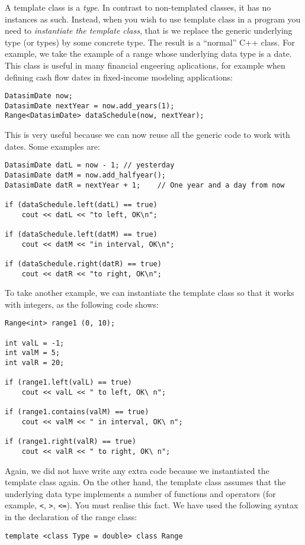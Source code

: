 A template class is a \emph{type}. In contrast to non-templated classes, it has no instances as such. Instead, when you wish to use template class in a program you need to \emph{instantiate the template class}, that is we replace the generic underlying type (or types) by some concrete type. The result is a ``normal'' C++ class. For example, we take the example of a range whose underlying data type is a date. This class is useful in many financial engeering aplications, for example when defining cash flow dates in fixed-income modeling applications:
\begin{lstlisting}
DatasimDate now;
DatasimDate nextYear = now.add_years(1);
Range<DatasimDate> dataSchedule(now, nextYear);
\end{lstlisting}
This is very useful because we can now reuse all the generic code to work with dates. Some examples are:
\begin{lstlisting}
DatasimDate datL = now - 1;	// yesterday
DatasimDate datM = now.add_halfyear();
DatasimDate datR = nextYear + 1;	// One year and a day from now

if (dataSchedule.left(datL) == true)
	cout << datL << "to left, OK\n";

if (dataSchedule.left(datM) == true)
	cout << datM << "in interval, OK\n";

if (dataSchedule.right(datR) == true)
	cout << datR << "to right, OK\n";
\end{lstlisting}
To take another example, we can instantiate the template class so that it works with integers, as the following code shows:
\begin{lstlisting}
Range<int> range1 (0, 10);

int valL = -1;
int valM = 5;
int valR = 20;

if (range1.left(valL) == true)
	cout << valL << " to left, OK\ n";

if (range1.contains(valM) == true)
	cout << valM << " in interval, OK\ n";

if (range1.right(valR) == true)
	cout << valR << " to right, OK\ n";
\end{lstlisting}
Again, we did not have write any extra code because we instantiated the template class again. On the other hand, the template class assumes that the underlying data type implements a number of functions and operators (for example, \texttt{<}, \texttt{>}, \texttt{<=}). You must realise this fact. We have used the following syntax in the declaration of the range class:
\begin{lstlisting}
template <class Type = double> class Range
\end{lstlisting}
